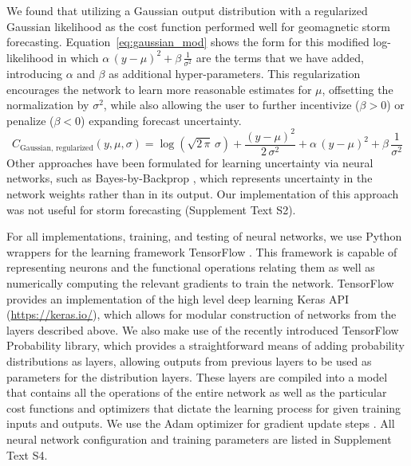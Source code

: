 \documentclass[draft,linenumbers]{agujournal2018}
\begin{document}
We found that utilizing a Gaussian output distribution with a regularized Gaussian likelihood as the cost function performed well for geomagnetic storm forecasting. Equation~\ref{eq:gaussian_mod} shows the form for this modified log-likelihood in which $\alpha\,(y-\mu)^2 + \beta\,\frac{1}{\sigma^2}$ are the terms that we have added, introducing $\alpha$ and $\beta$ as additional hyper-parameters. This regularization encourages the network to learn more reasonable estimates for $\mu$, offsetting the normalization by $\sigma^2$, while also allowing the user to further incentivize ($\beta > 0$) or penalize ($\beta < 0$) expanding forecast uncertainty.
\begin{equation}
    C_{\mathrm{Gaussian,\, regularized}}(y, \mu, \sigma) = \log\left(\sqrt{2\,\pi}\,\sigma \right) + \frac{\left(y-\mu \right)^2}{2\,\sigma^2} +  \alpha\,\left(y-\mu \right)^2 + \beta\,\frac{1}{\sigma^2} \label{eq:gaussian_mod}
\end{equation}
Other approaches have been formulated for learning uncertainty via neural networks, such as Bayes-by-Backprop \citep{Blundell2015}, which represents uncertainty in the network weights rather than in its output. Our implementation of this approach was not useful for storm forecasting (Supplement Text S2).

For all implementations, training, and testing of neural networks, we use Python wrappers for the learning framework TensorFlow \citep{tensorflow}. This framework is capable of representing neurons and the functional operations relating them as well as numerically computing the relevant gradients to train the network. TensorFlow provides an implementation of the high level deep learning Keras API (\url{https://keras.io/}), which allows for modular construction of networks from the layers described above. We also make use of the recently introduced TensorFlow Probability library, which provides a straightforward means of adding probability distributions as layers, allowing outputs from previous layers to be used as parameters for the distribution layers. These layers are compiled into a model that contains all the operations of the entire network as well as the particular cost functions and optimizers that dictate the learning process for given training inputs and outputs. We use the Adam optimizer for gradient update steps \citep{Kingma2014adam}. All neural network configuration and training parameters are listed in Supplement Text S4.


\end{document}

